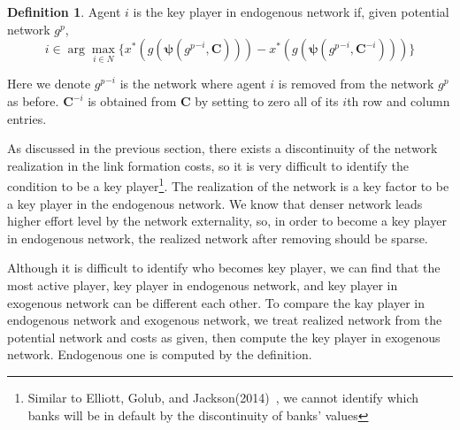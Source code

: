 \documentclass[12pt]{article}
\theoremstyle{definition}
\newtheorem{definition}{Definition}
\begin{document}
\begin{definition}
Agent $i$ is the key player in endogenous network if, given potential network $g^p$,
\[ i \in \arg \max_{i \in N} \{ x^*(g(\bm{\psi}({g^p}^{-i}, \bm{C}))) - x^*(g(\bm{\psi}({g^p}^{-i}, \bm{C}^{-i}))) \} \]
\end{definition}
Here we denote ${g^p}^{-i}$ is the network where agent $i$ is removed from the network $g^p$ as before.
$\bm{C}^{-i}$ is obtained from $\bm{C}$ by setting to zero all of its $i$th row and column entries.

As discussed in the previous section, there exists a discontinuity of the network realization in the link formation costs, so it is very difficult to identify the condition to be a key player\footnote{Similar to Elliott, Golub, and Jackson(2014)~\cite{contagion}, we cannot identify which banks will be in default by the discontinuity of banks' values}.
The realization of the network is a key factor to be a key player in the endogenous network.
We know that denser network leads higher effort level by the network externality, so, in order to become a key player in endogenous network, the realized network after removing should be sparse.

Although it is difficult to identify who becomes key player, we can find that the most active player, key player in endogenous network, and key player in exogenous network can be different each other.
To compare the kay player in endogenous network and exogenous network, we treat realized network from the potential network and costs as given, then compute the key player in exogenous network.
Endogenous one is computed by the definition.
\end{document}
